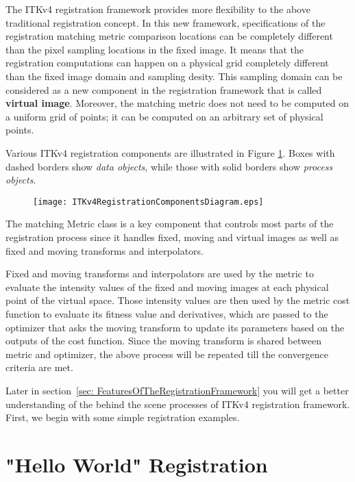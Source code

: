 The ITKv4 registration framework provides more flexibility to the above traditional
registration concept. In this new framework, specifications of the registration
matching metric comparison locations can be completely different than the pixel
sampling locations in the fixed image.
It means that the registration computations can happen on a physical grid
completely different than the fixed image domain and sampling desity.
This sampling domain can be considered as a new component in the registration
framework that is called \textbf{virtual image}. Moreover, the matching metric
does not need to be computed on a uniform grid of points; it can be computed
on an arbitrary set of physical points.

Various ITKv4 registration components are illustrated in Figure
\ref{fig:ITKv4RegistrationComponents}. Boxes with dashed borders show
\emph{data objects}, while those with solid borders show \emph{process objects}.

\begin{figure}
\center
\texttt{[image: ITKv4RegistrationComponentsDiagram.eps]}
\label{fig:ITKv4RegistrationComponents}
\end{figure}

The matching Metric class is a key component that controls most parts of the
registration process since it handles fixed, moving and virtual images as well
as fixed and moving transforms and interpolators.

Fixed and moving transforms and interpolators are used by the metric to evaluate
the intensity values of the fixed and moving images at each physical point of the
virtual space. Those intensity values are then used by the metric cost function to
evaluate its fitness value and derivatives, which are passed to the optimizer that
asks the moving transform to update its parameters based on the outputs of the cost
function. Since the moving transform is shared between metric and optimizer,
the above process will be repeated till the convergence criteria are met.

Later in section~\ref{sec: FeaturesOfTheRegistrationFramework} you will get a
better understanding of the behind the scene processes of ITKv4 registration
framework. First, we begin with some simple registration examples.


\section{"Hello World" Registration}
\label{sec:IntroductionImageRegistration}
\ifitkFullVersion

\fi

